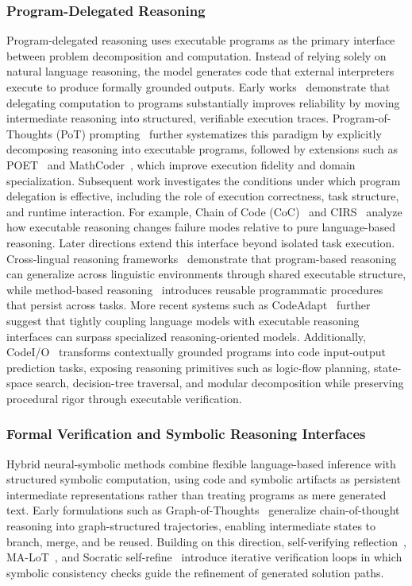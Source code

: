 \documentclass{llmxive}
\begin{document}
\subsubsection{Program-Delegated Reasoning}
Program-delegated reasoning uses executable programs as the
primary interface between problem decomposition and computation.
Instead of relying solely on natural language reasoning, the
model generates code that external interpreters execute to
produce formally grounded outputs.
Early works~\cite{nye2021show,gao2023pal} demonstrate that
delegating computation to programs substantially improves
reliability by moving intermediate reasoning into structured,
verifiable execution traces.
Program-of-Thoughts (PoT) prompting~\cite{chen2022program}
further systematizes this paradigm by explicitly decomposing
reasoning into executable programs, followed by extensions such
as POET~\cite{pi2022reasoning} and
MathCoder~\cite{wang2023mathcoder}, which improve execution
fidelity and domain specialization.
Subsequent work investigates the conditions under which program
delegation is effective, including the role of execution
correctness, task structure, and runtime interaction.
For example, Chain of Code (CoC)~\cite{li2023chain} and
CIRS~\cite{bi2024program} analyze how executable reasoning
changes failure modes relative to pure language-based reasoning.
Later directions extend this interface beyond isolated task
execution. Cross-lingual reasoning
frameworks~\cite{payoungkhamdee2025towards} demonstrate that
program-based reasoning can generalize across linguistic
environments through shared executable structure, while
method-based reasoning~\cite{su2025method} introduces reusable
programmatic procedures that persist across tasks.
More recent systems such as
CodeAdapt~\cite{zhang2025code} further suggest that tightly
coupling language models with executable reasoning interfaces can surpass specialized reasoning-oriented models. Additionally, CodeI/O~\cite{pmlr-v267-li25t} transforms contextually grounded programs into code input-output prediction tasks, exposing reasoning primitives such as logic-flow planning, state-space search, decision-tree traversal, and modular decomposition while preserving procedural rigor through executable verification.

\subsubsection{Formal Verification and Symbolic Reasoning Interfaces}

Hybrid neural-symbolic methods combine flexible language-based inference with structured symbolic computation, using code and symbolic artifacts as persistent intermediate representations rather than treating programs as mere generated text. Early formulations such as Graph-of-Thoughts~\cite{besta2024graph} generalize chain-of-thought reasoning into graph-structured trajectories, enabling intermediate states to branch, merge, and be reused. Building on this direction, self-verifying reflection~\cite{yu2025self}, MA-LoT~\cite{wang2025ma}, and Socratic self-refine~\cite{shi2025ssr} introduce iterative verification loops in which symbolic consistency checks guide the refinement of generated solution paths.
\end{document}

